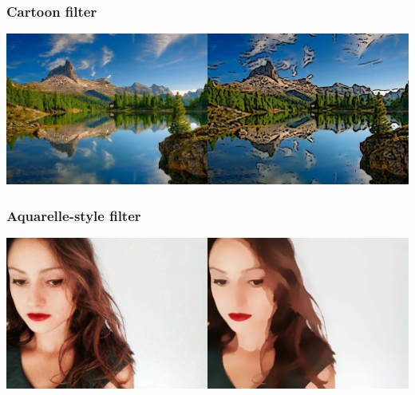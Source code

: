 \documentclass{beamer}
\begin{document}
\begin{frame}[fragile]
\frametitle{Cartoon filter}
\begin{center}
\includegraphics[scale=0.23]{kepek/cartoon/3_cartoon_filter2.jpg}
\end{center}
\end{frame}


\begin{frame}[fragile]
\frametitle{Aquarelle-style filter}
\begin{center}
\includegraphics[scale=0.23]{kepek/aquarelle_style/4_paint_filter.jpg}
\end{center}
\end{frame}
\end{document}
